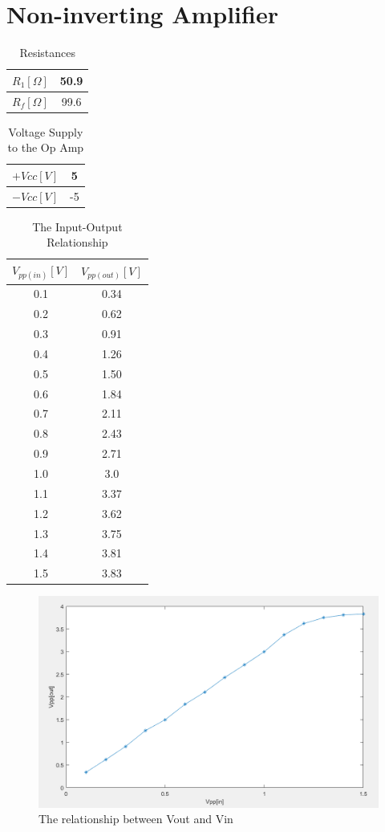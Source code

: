 \documentclass{article}
\begin{document}
\section{Non-inverting Amplifier}
\begin{table}[H]
	\centering
	\begin{tabular}{|c|c|}
		\hline
		$R_1[\Omega]$&50.9\\
		\hline
		$R_f[\Omega]$&99.6\\
		\hline
	\end{tabular}
	\caption{Resistances}
\end{table}
\begin{table}[H]
	\centering
	\begin{tabular}{|c|c|}
		\hline
		$+Vcc[V]$&5\\
		\hline
		$-Vcc[V]$&-5\\
		\hline
	\end{tabular}
	\caption{Voltage Supply to the Op Amp}
\end{table}
\begin{table}[H]
	\centering
	\begin{tabular}{|c|c|}
		\hline
		$V_{pp(in)}[V]$&$V_{pp(out)}[V]$\\
		\hline
		0.1&0.34\\
		\hline
		0.2&0.62\\
		\hline
		0.3&0.91\\
		\hline
		0.4&1.26\\
		\hline
		0.5&1.50\\
		\hline
		0.6&1.84\\
		\hline
		0.7&2.11\\
		\hline
		0.8&2.43\\
		\hline
		0.9&2.71\\
		\hline
		1.0&3.0\\
		\hline
		1.1&3.37\\
		\hline
		1.2&3.62\\
		\hline
		1.3&3.75\\
		\hline
		1.4&3.81\\
		\hline
		1.5&3.83\\
		\hline
	\end{tabular}
	\caption{The Input-Output Relationship}
\end{table}
\begin{figure}[H]
	\centering
	\includegraphics[width=0.7\linewidth]{noninverting}
	\caption{The relationship between Vout and Vin}
	\label{fig:noninverting}
\end{figure}
\end{document}
